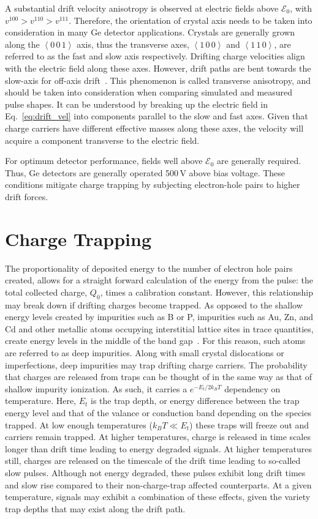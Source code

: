 A substantial drift velocity anisotropy is observed at electric fields above $\mathcal{E}_0$, with $v^{100} > v^{110} > v^{111}$. Therefore, the orientation of crystal axis needs to be taken into consideration in many Ge detector applications. Crystals are generally grown along the $\left<0\,0\,1\right>$ axis, thus the transverse axes, $\left<1\,0\,0\right>$ and $\left<1\,1\,0\right>$, are referred to as the fast and slow axis respectively. Drifting charge velocities align with the electric field along these axes. However, drift paths are bent towards the slow-axis for off-axis drift~\cite{Mihailescu2000}. This phenomenon is called transverse anisotropy, and should be taken into consideration when comparing simulated and measured pulse shapes. It can be understood by breaking up the electric field in Eq.~\ref{eq:drift_vel} into components parallel to the slow and fast axes. Given that charge carriers have different effective masses along these axes, the velocity will acquire a component transverse to the electric field. 

For optimum detector performance, fields well above $\mathcal{E}_0$ are generally required. Thus, Ge detectors are generally operated 500\,V above bias voltage. These conditions mitigate charge trapping by subjecting electron-hole pairs to higher drift forces.

\section{Charge Trapping}\label{sec:charge_trapping}
The proportionality of deposited energy to the number of electron hole pairs created, allows for a straight forward calculation of the energy from the pulse: the total collected charge, $Q_0$, times a calibration constant. However, this relationship may break down if drifting charges become trapped. As opposed to the shallow energy levels created by impurities such as B or P, impurities such as Au, Zn, and Cd and other metallic atoms occupying interstitial lattice sites in trace quantities, create energy levels in the middle of the band gap~\cite{deep_impurities}. For this reason, such atoms are referred to as deep impurities. Along with small crystal dislocations or imperfections, deep impurities may trap drifting charge carriers. The probability that charges are released from traps can be thought of in the same way as that of shallow impurity ionization. As such, it carries a $e^{-E_t/2k_BT}$ dependency on temperature. Here, $E_t$ is the trap depth, or energy difference between the trap energy level and that of the valance or conduction band depending on the species trapped. At low enough temperatures ($k_BT \ll E_t$) these traps will freeze out and carriers remain trapped. At higher temperatures, charge is released in time scales longer than drift time leading to energy degraded signals. At higher temperatures still, charges are released on the timescale of the drift time leading to so-called slow pulses. Although not energy degraded, these pulses exhibit long drift times and slow rise compared to their non-charge-trap affected counterparts. At a given temperature, signals may exhibit a combination of these effects, given the variety trap depths that may exist along the drift path. 

